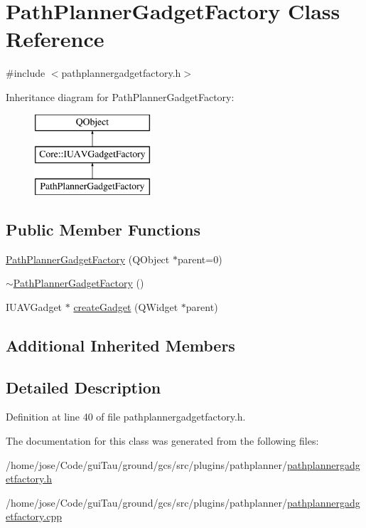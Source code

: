 \hypertarget{class_path_planner_gadget_factory}{\section{Path\-Planner\-Gadget\-Factory Class Reference}
\label{class_path_planner_gadget_factory}
}


{\ttfamily \#include $<$pathplannergadgetfactory.\-h$>$}

Inheritance diagram for Path\-Planner\-Gadget\-Factory\-:\begin{figure}[H]
\begin{center}
\leavevmode
\includegraphics[height=3.000000cm]{class_path_planner_gadget_factory}
\end{center}
\end{figure}
\subsection*{Public Member Functions}
\begin{DoxyCompactItemize}
\item 
\hyperlink{group___path_planner_gadget_plugin_ga88e48bf90ce31bd235b33782dfe905e9}{Path\-Planner\-Gadget\-Factory} (Q\-Object $\ast$parent=0)
\item 
\hyperlink{group___path_planner_gadget_plugin_ga2dfd582034d463500837f0eaf0d01bd6}{$\sim$\-Path\-Planner\-Gadget\-Factory} ()
\item 
I\-U\-A\-V\-Gadget $\ast$ \hyperlink{group___path_planner_gadget_plugin_gaae19a3f321bbfe2ff8c6f75d2202d22e}{create\-Gadget} (Q\-Widget $\ast$parent)
\end{DoxyCompactItemize}
\subsection*{Additional Inherited Members}


\subsection{Detailed Description}


Definition at line 40 of file pathplannergadgetfactory.\-h.



The documentation for this class was generated from the following files\-:\begin{DoxyCompactItemize}
\item 
/home/jose/\-Code/gui\-Tau/ground/gcs/src/plugins/pathplanner/\hyperlink{pathplannergadgetfactory_8h}{pathplannergadgetfactory.\-h}\item 
/home/jose/\-Code/gui\-Tau/ground/gcs/src/plugins/pathplanner/\hyperlink{pathplannergadgetfactory_8cpp}{pathplannergadgetfactory.\-cpp}\end{DoxyCompactItemize}
